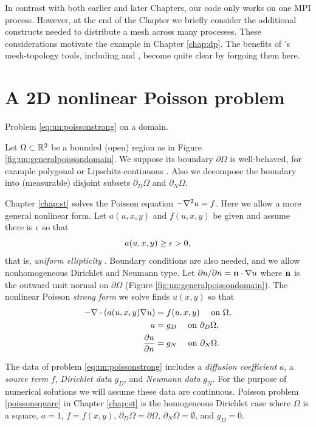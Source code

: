 In contrast with both earlier and later Chapters, our code only works on one MPI process.  However, at the end of the Chapter we briefly consider the additional constructs needed to distribute a mesh across many processes.  These considerations motivate the \pDMPlex example in Chapter \ref{chap:dp}.  The benefits of \PETSc's mesh-topology \pDM tools, including \pDMDA and \pDMPlex, become quite clear by forgoing them here.


\section{A 2D nonlinear Poisson problem}

\begin{marginfigure}

\caption{Problem \eqref{eq:un:poissonstrong} on a domain.}
\label{fig:un:generalpoissondomain}
\end{marginfigure}

Let $\Omega \subset \mathbb{R}^2$ be a bounded (open) region as in Figure \ref{fig:un:generalpoissondomain}.  We suppose its boundary $\partial\Omega$ is well-behaved, for example polygonal or Lipschitz-continuous \citep[section 1.2]{Ciarlet2002}.  Also we decompose the boundary into (measurable) disjoint subsets $\partial_D \Omega$ and $\partial_N \Omega$.

Chapter \ref{chap:st} solves the Poisson equation $- \nabla^2 u = f$.  Here we allow a more general nonlinear form.  Let $a(u,x,y)$ and $f(u,x,y)$ be given and assume there is $\epsilon$ so that
\begin{equation}
a(u,x,y) \ge \epsilon > 0, \label{eq:un:uniformelliptic}
\end{equation}
that is, \emph{uniform ellipticity} \citep{Evans2010}.  Boundary conditions are also needed, and we allow nonhomogeneous Dirichlet and Neumann type.  Let $\partial u/\partial n = \mathbf{n} \cdot \nabla u$ where $\mathbf{n}$ is the outward unit normal on $\partial \Omega$ (Figure \ref{fig:un:generalpoissondomain}).  The nonlinear Poisson \emph{strong form} we solve finds $u(x,y)$ so that
\begin{align}
- \nabla\cdot \left(a(u,x,y) \nabla u\right) &= f(u,x,y) \quad \text{ on } \Omega, \label{eq:un:poissonstrong} \\
u &= g_D \quad \text{ on } \partial_D \Omega, \notag \\
\frac{\partial u}{\partial n} &= g_N \quad \text{ on } \partial_N \Omega. \notag
\end{align}

The data of problem \eqref{eq:un:poissonstrong} includes a \emph{diffusion coefficient} $a$, a \emph{source term} $f$, \emph{Dirichlet data} $g_D$, and \emph{Neumann data} $g_N$.  For the purpose of numerical solutions we will assume these data are continuous.  Poisson problem \eqref{poissonsquare} in Chapter \ref{chap:st} is the homogeneous Dirichlet case where $\Omega$ is a square, $a = 1$, $f=f(x,y)$, $\partial_D \Omega = \partial \Omega$, $\partial_N \Omega = \emptyset$, and $g_D=0$.

